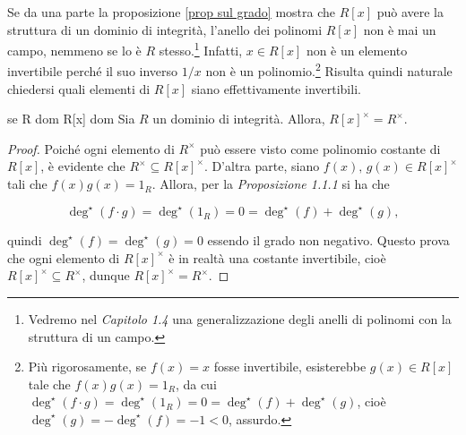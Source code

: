 \noindent Se da una parte la proposizione \ref{prop sul grado} mostra che $R[x]$ può avere la struttura di un dominio di integrità, l'anello dei polinomi $R[x]$ non è mai un campo, nemmeno se lo è $R$ stesso.\footnote{Vedremo nel \emph{Capitolo 1.4} una generalizzazione degli anelli di polinomi con la struttura di un campo.} Infatti, $x\in R[x]$ non è un elemento invertibile perché il suo inverso $1/x$ non è un polinomio.\footnote{Più rigorosamente, se $f(x)=x$ fosse invertibile, esisterebbe $g(x)\in R[x]$ tale che $f(x)g(x)=1_R$, da cui $\deg^{\star}(f\cdot g)=\deg^{\star}(1_R)=0=\deg^{\star}(f)+\deg^{\star}(g)$, cioè $\deg^{\star}(g)=-\deg^{\star}(f)=-1<0$, assurdo.} Risulta quindi naturale chiedersi quali elementi di $R[x]$ siano effettivamente invertibili.

\clearpage
\begin{prop}[]{se R dom R[x] dom}
Sia $R$ un dominio di integrità. Allora, $R[x]^{\times}=R^{\times}$.
\end{prop}
\vspace{-4mm}
\begin{proof}
Poiché ogni elemento di $R^{\times}$ può essere visto come polinomio costante di~$R[x]$, è evidente che 
$R^{\times}\subseteq R[x]^{\times}$. D'altra parte, siano $f(x),\,g(x)\in R[x]^{\times}$ tali che 
$f(x)g(x)=1_R$. Allora, per la \emph{Proposizione 1.1.1} si ha che 

\[\deg^{\star}(f\cdot g)=\deg^{\star}(1_R)=0=\deg^{\star}(f)+\deg^{\star}(g),\] 

\noindent quindi $\deg^{\star}(f)=\deg^{\star}(g)=0$ essendo il grado non negativo. Questo prova che 
ogni elemento di $R[x]^{\times}$ è in realtà una costante invertibile, cioè 
$R[x]^{\times}\subseteq R^{\times}$, dunque $R[x]^{\times}=R^{\times}$.
\end{proof}

